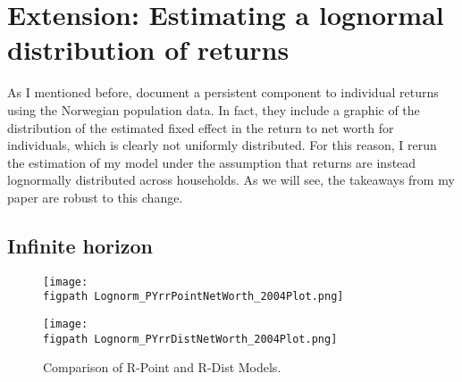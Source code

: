 \makeatletter
{}
\makeatother

\ifSubfilesClass
  \def\figpath{../Figures/}
  \def\tblpath{Tables/}
\else
  \def\figpath{Figures/}
  \def\tblpath{Tables/}
\fi

\onlyinsubfile{\setcounter{section}{5}}
\section{Extension: Estimating a lognormal distribution of returns}
\notinsubfile{\label{sec:lognorm}}

\par As I mentioned before, \cite{aflgdmlp20} document a persistent component to individual returns using the Norwegian population data. In fact, they include a graphic of the distribution of the estimated fixed effect in the return to net worth for individuals, which is clearly not uniformly distributed. For this reason, I rerun the estimation of my model under the assumption that returns are instead lognormally distributed across households. As we will see, the takeaways from my paper are robust to this change.

\subsection{Infinite horizon}

\par 

\begin{figure}[h]
    \centering
    \begin{minipage}{0.48\textwidth}
        \centering
        \texttt{[image: \\figpath Lognorm\_PYrrPointNetWorth\_2004Plot.png]}
    \end{minipage}
    \hfill
    \begin{minipage}{0.48\textwidth}
        \centering
        \texttt{[image: \\figpath Lognorm\_PYrrDistNetWorth\_2004Plot.png]}
    \end{minipage}
    \caption{Comparison of R-Point and R-Dist Models.}
    \label{fig:PYLognorm} 
\end{figure}

